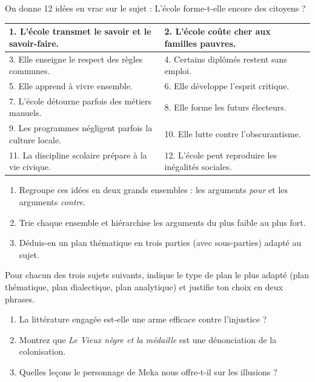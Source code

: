 \documentclass[11pt]{article}
\begin{document}
\begin{exercice}
On donne 12 idées en vrac sur le sujet : \og L'école forme-t-elle encore des citoyens ? \fg{}
\begin{center}
\begin{tabularx}{\linewidth}{|X|X|}\hline
1. L'école transmet le savoir et le savoir-faire. & 2. L'école coûte cher aux familles pauvres. \\ \hline
3. Elle enseigne le respect des règles communes. & 4. Certains diplômés restent sans emploi. \\ \hline
5. Elle apprend à vivre ensemble. & 6. Elle développe l'esprit critique. \\ \hline
7. L'école détourne parfois des métiers manuels. & 8. Elle forme les futurs électeurs. \\ \hline
9. Les programmes négligent parfois la culture locale. & 10. Elle lutte contre l'obscurantisme. \\ \hline
11. La discipline scolaire prépare à la vie civique. & 12. L'école peut reproduire les inégalités sociales. \\ \hline
\end{tabularx}
\end{center}
\begin{enumerate}
\item Regroupe ces idées en deux grands ensembles : les arguments \emph{pour} et les arguments \emph{contre}.
\item Trie chaque ensemble et hiérarchise les arguments du plus faible au plus fort.
\item Déduis-en un plan thématique en trois parties (avec sous-parties) adapté au sujet.
\end{enumerate}
\end{exercice}

\begin{exercice}
Pour chacun des trois sujets suivants, indique le type de plan le plus adapté (plan thématique, plan dialectique, plan analytique) et justifie ton choix en deux phrases.
\begin{enumerate}
\item \og La littérature engagée est-elle une arme efficace contre l'injustice ? \fg{}
\item \og Montrez que \emph{Le Vieux nègre et la médaille} est une dénonciation de la colonisation. \fg{}
\item \og Quelles leçons le personnage de Meka nous offre-t-il sur les illusions ? \fg{}
\end{enumerate}
\end{exercice}
\end{document}
